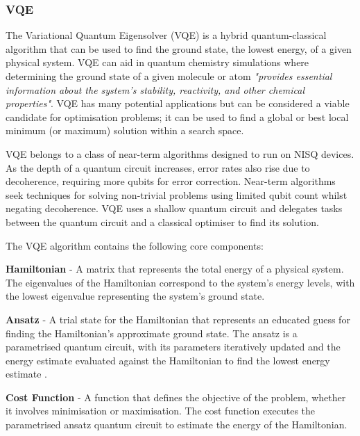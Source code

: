 \documentclass{article}
\begin{document}
{\subsubsection{VQE}

The Variational Quantum Eigensolver (VQE) is a hybrid quantum-classical algorithm that can be used to find the ground state, the lowest energy, of a given physical system\cite{wikivqe}. VQE can aid in quantum chemistry simulations where determining the ground state of a given molecule or atom \textit{"provides essential information about the system's stability, reactivity, and other chemical properties"}\cite{queragroundstate}. VQE has many potential applications but can be considered a viable candidate for optimisation problems; it can be used to find a global or best local minimum (or maximum) solution within a search space\cite{vqeqiskit}\cite{VQEMax}. 

VQE belongs to a class of near-term algorithms designed to run on NISQ devices. As the depth of a quantum circuit increases, error rates also rise due to decoherence, requiring more qubits for error correction. Near-term algorithms seek techniques for solving non-trivial problems using limited qubit count whilst negating decoherence\cite{Huang_2023}. VQE uses a shallow quantum circuit and delegates tasks between the quantum circuit and a classical optimiser to find its solution\cite{vqeqiskit}\cite{Peruzzo2014}.

The VQE algorithm contains the following core components:

\textbf{Hamiltonian} - A matrix that represents the total energy of a physical system\cite{hamiltonian}. The eigenvalues of the Hamiltonian correspond to the system's energy levels, with the lowest eigenvalue representing the system's ground state\cite{vqeqiskit}.

\textbf{Ansatz} - A trial state for the Hamiltonian that represents an educated guess for finding the Hamiltonian's approximate ground state. The ansatz is a parametrised quantum circuit, with its parameters iteratively updated and the energy estimate evaluated against the Hamiltonian to find the lowest energy estimate\cite{ansatz} \cite{wikiansatz} \cite{Tutorial}.

\textbf{Cost Function} - A function that defines the objective of the problem, whether it involves minimisation or maximisation. The cost function executes the parametrised ansatz quantum circuit to estimate the energy of the Hamiltonian\cite{Tutorial}\cite{vqeqiskit}.

}
\end{document}
